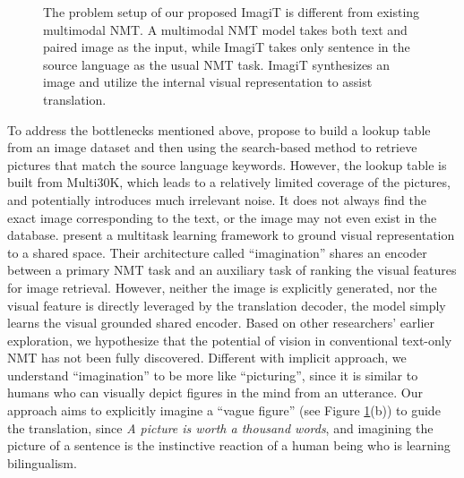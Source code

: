 \documentclass[11pt]{article}
\newcommand{\method}{ImagiT\xspace}
\begin{document}
\begin{figure}[!t]
\centering
{}
\subfigure[\method]
{
\centering
\texttt{[image: fig/ImagiNMT.pdf]}
}
\caption{The problem setup of our proposed \method is different from existing multimodal NMT. A multimodal NMT model takes both text and paired image as the input, while \method takes only sentence in the source language as the usual NMT task. \method synthesizes an image and utilize the internal visual representation to assist translation. }
\label{fig1}
\end{figure}



To address the bottlenecks mentioned above, \citet{zhang2019neural} propose to build a lookup table from an image dataset and then using the search-based method to retrieve pictures that match the source language keywords. 
However, the lookup table is built from Multi30K, which leads to a relatively limited coverage of the pictures, and potentially introduces much irrelevant noise. 
It does not always find the exact image corresponding to the text, or the image may not even exist in the database. 
\citet{elliott2017imagination} present a multitask learning framework to ground visual representation to a shared space. 
Their architecture called ``imagination'' shares an encoder between a primary NMT task and an auxiliary task of ranking the visual features for image retrieval. 
However, neither the image is explicitly generated, nor the visual feature is directly leveraged by the translation decoder, the model simply learns the visual grounded shared encoder. Based on other researchers' earlier exploration, we hypothesize that the potential of vision in conventional text-only NMT has not been fully discovered. Different with \citet{elliott2017imagination} implicit approach, we understand ``imagination'' to be more like ``picturing'', since it is similar to humans who can visually depict figures in the mind from an utterance. Our approach aims to explicitly imagine a ``vague figure'' (see Figure \ref{fig1}(b)) to guide the translation, since \emph{A picture is worth a thousand words}, and imagining the picture of a sentence is the instinctive reaction of a human being who is learning bilingualism.
\end{document}
